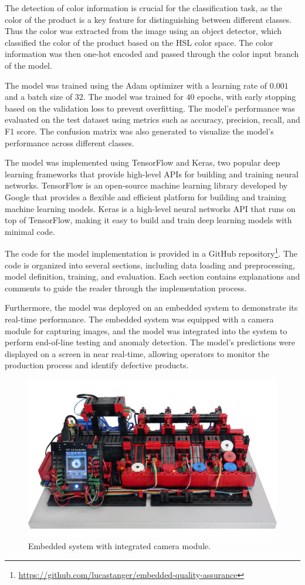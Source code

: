 \documentclass[lettersize,journal]{IEEEtran}
\begin{document}
The detection of color information is crucial for the classification task, as the color of the product is a key feature for distinguishing between different classes. Thus the color was extracted from the image using an object detector, which classified the color of the product based on the HSL color space. The color information was then one-hot encoded and passed through the color input branch of the model.

The model was trained using the Adam optimizer with a learning rate of $0.001$ and a batch size of $32$. The model was trained for $40$ epochs, with early stopping based on the validation loss to prevent overfitting. The model's performance was evaluated on the test dataset using metrics such as accuracy, precision, recall, and F1 score. The confusion matrix was also generated to visualize the model's performance across different classes.

The model was implemented using TensorFlow and Keras, two popular deep learning frameworks that provide high-level APIs for building and training neural networks. TensorFlow is an open-source machine learning library developed by Google that provides a flexible and efficient platform for building and training machine learning models. Keras is a high-level neural networks API that runs on top of TensorFlow, making it easy to build and train deep learning models with minimal code.

The code for the model implementation is provided in a GitHub repository\footnote{\url{https://github.com/lucastanger/embedded-quality-assurance}}. The code is organized into several sections, including data loading and preprocessing, model definition, training, and evaluation. Each section contains explanations and comments to guide the reader through the implementation process.

Furthermore, the model was deployed on an embedded system to demonstrate its real-time performance. The embedded system was equipped with a camera module for capturing images, and the model was integrated into the system to perform end-of-line testing and anomaly detection. The model's predictions were displayed on a screen in near real-time, allowing operators to monitor the production process and identify defective products.

\begin{figure}[!h]
  \centering
  \includegraphics[width=.4\textwidth]{images/ft-board.png}
  \caption{Embedded system with integrated camera module.}
  
  \label{fig:embeded_system}
\end{figure}
\end{document}
